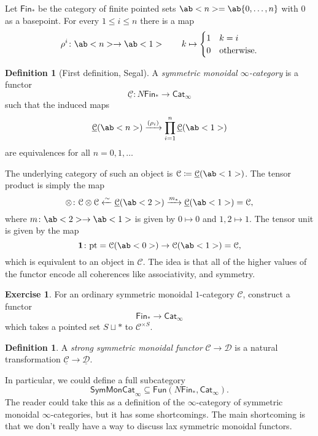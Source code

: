 \documentclass[10pt]{amsart}
\theoremstyle{definition}
\newtheorem{defn}[thm]{Definition}
\newtheorem{exer}[thm]{Exercise}
\theoremstyle{remark}
\theoremstyle{plain}
\theoremstyle{definition}
\theoremstyle{remark}
\newcommand{\mc}[1]{\mathcal{#1}}
\newcommand{\mr}[1]{\mathrm{#1}}
\newcommand{\ms}[1]{\mathsf{#1}}
\newcommand{\ul}[1]{\underline{#1}}
\newcommand{\1}{\mathbf{1}}
\newcommand{\2}{\mathbf{2}}
\newcommand{\3}{\mathbf{3}}
\newcommand{\pt}{\mr{pt}}
\begin{document}
Let $\ms{Fin}_*$ be the category of finite pointed sets $\ab<n> = \ab\{0, \ldots, n \}$ with $0$ as a basepoint. For every $1 \leq i \leq n$ there is a map
\[ \rho^i \colon \ab<n> \to \ab<1> \qquad k \mapsto \begin{cases}
    1 & k=i \\
    0 & \text{otherwise}.
\end{cases} \]

\begin{defn}[First definition, Segal]
    A \textit{symmetric monoidal $\infty$-category} is a functor
    \[ \ul{\mc{C}} \colon N \ms{Fin}_* \to \ms{Cat}_{\infty} \]
    such that the induced maps
    \[ \ul{\mc{C}}(\ab<n>) \xrightarrow{(\rho_i)} \prod_{i=1}^n \ul{\mc{C}}(\ab<1>) \]
    are equivalences for all $n = 0, 1, \ldots$
\end{defn}

The underlying category of such an object is $\mc{C} \coloneqq \ul{\mc{C}}(\ab<1>)$. The tensor product is simply the map
\[ \otimes \colon \mc{C} \otimes \mc{C} \xleftarrow{\sim} \ul{\mc{C}}(\ab<2>) \xrightarrow{m_*} \ul{\mc{C}}(\ab<1>)= \mc{C}, \]
where $m \colon \ab<2> \to \ab<1>$ is given by $0 \mapsto 0$ and $1,2 \mapsto 1$. The tensor unit is given by the map
\[ \1 \colon \pt = \mc{C}(\ab<0>) \to \mc{C}(\ab<1>) = \mc{C}, \]
which is equivalent to an object in $\mc{C}$. The idea is that all of the higher values of the functor encode all coherences like associativity, and symmetry.

\begin{exer}
    For an ordinary symmetric monoidal $1$-category $\mc{C}$, construct a functor
    \[ \ms{Fin}_* \to \ms{Cat}_{\infty} \]
    which takes a pointed set $S \sqcup *$ to $\mc{C}^{\times S}$.
\end{exer}

\begin{defn}
    A \textit{strong symmetric monoidal functor} $\mc{C} \to \mc{D}$ is a natural transformation $\ul{\mc{C}} \to \ul{\mc{D}}$.
\end{defn}

In particular, we could define a full subcategory
\[ \ms{SymMonCat}_{\infty} \subseteq \ms{Fun}(N\ms{Fin}_*, \ms{Cat}_{\infty}). \]
The reader could take this as a definition of the $\infty$-category of symmetric monoidal $\infty$-categories, but it has some shortcomings. The main shortcoming is that we don't really have a way to discuss lax symmetric monoidal functors.
\end{document}
